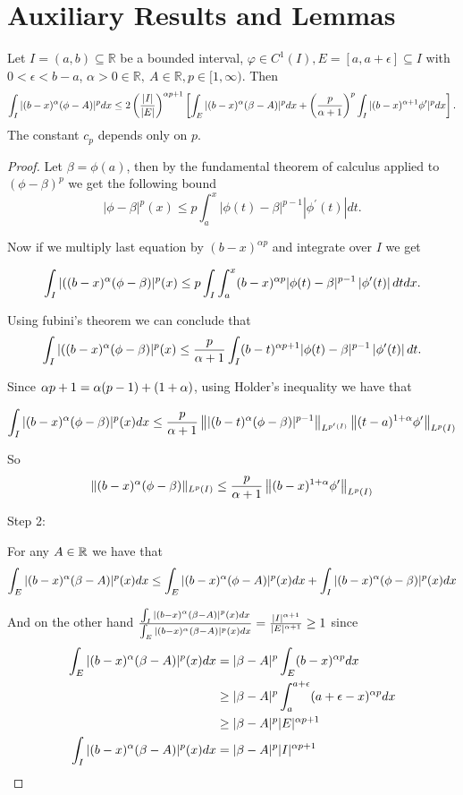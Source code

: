 \section{Auxiliary Results and Lemmas}
\begin{lemma}
\label{1dimPoinc}
Let $I=(a, b) \subseteq \mathbb{R}$ be a bounded interval, $\varphi \in C^1(I), E=[a,a+\epsilon] \subseteq I$ with $0<\epsilon< b-a$, $\alpha > 0 \in \mathbb{R},\ A \in \mathbb{R},  p \in[1, \infty)$. Then
$$
\int_I|(b-x)^\alpha(\phi-A)|^p d x \leq 2 \left(\frac{|I|}{|E|}\right)^{\alpha p+1}\left[\int_E|(b-x)^\alpha(\beta-A)|^p d x+\left(\frac{p}{\alpha+1}\right)^p\int_I|(b-x)^{\alpha+1}\phi'|^p d x\right]. 
$$
The constant $c_p$ depends only on $p$.
\end{lemma}

\begin{proof}
Let $\beta = \phi(a)$, then by the fundamental theorem of calculus  applied to $(\phi-\beta)^p$ we get the following bound
$$|\phi-\beta|^p(x) \leq p \int_a^x|\phi(t)-\beta|^{p-1}\left|\phi^{\prime}(t)\right| d t .$$

Now if we multiply last equation by $(b-x)^{\alpha p}$ and integrate over $I$ we get

$$\int_I|((b-x)^\alpha(\phi-\beta)|^p(x) \leq p \int_I\int_a^x(b-x)^{\alpha p}|\phi(t)-\beta|^{p-1}\left|\phi^{\prime}(t)\right| d t dx.$$

Using fubini's theorem we can conclude that
$$\int_I|((b-x)^\alpha(\phi-\beta)|^p(x) \leq \frac{p}{\alpha+1} \int_I(b-t)^{\alpha p+1}|\phi(t)-\beta|^{p-1}\left|\phi^{\prime}(t)\right| d t.$$

Since $\alpha p +1 = \alpha(p-1) + (1+\alpha)$, using Holder's inequality we  have that

$$\int_I|(b-x)^\alpha(\phi-\beta)|^p(x) d x \leq \frac{p}{\alpha+1}\left\||(b-t)^\alpha(\phi-\beta)|^{p-1}\right\|_{L^{p^{\prime}(I)}}\left\|(t-a)^{1+\alpha} \phi^{\prime}\right\|_{L^p(I)}$$

So $$\|(b-x)^\alpha(\phi-\beta)\|_{L^p(I)} \leq \frac{p}{\alpha+1}\left\|(b-x)^{1+\alpha} \phi^{\prime}\right\|_{L^p(I)}$$

Step 2:

For any $A\in \mathbb{R}$ we have that
$$\int_E|(b-x)^\alpha(\beta-A)|^p(x) d x \leq \int_E|(b-x)^\alpha(\phi-A)|^p(x) d x +\int_I|(b-x)^\alpha(\phi-\beta)|^p(x) d x$$

And on the other hand $\frac{\int_I|(b-x)^\alpha(\beta-A)|^p(x) d x}{\int_E|(b-x)^\alpha(\beta-A)|^p(x) d x }=\frac{|I|^{\alpha+1}}{|E|^{\alpha+1}}\geq 1 $ since 
\begin{align*}
\int_E|(b-x)^\alpha(\beta-A)|^p(x) d x &= |\beta-A|^p \int_E (b-x)^{\alpha p} d x \\
&\geq  |\beta-A|^p \int_a^{a+\epsilon} (a+\epsilon-x)^{\alpha p} d x\\
&\geq |\beta-A|^p |E|^{\alpha p+1}\\
\int_I|(b-x)^\alpha(\beta-A)|^p(x) d x &= |\beta-A|^p |I|^{\alpha p+1}
\end{align*} 


\end{proof}
